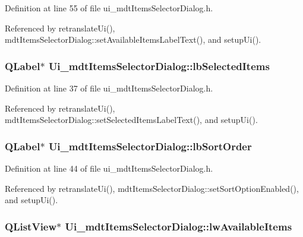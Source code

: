 Definition at line 55 of file ui\-\_\-mdt\-Items\-Selector\-Dialog.\-h.



Referenced by retranslate\-Ui(), mdt\-Items\-Selector\-Dialog\-::set\-Available\-Items\-Label\-Text(), and setup\-Ui().

\hypertarget{class_ui__mdt_items_selector_dialog_a4d76bc016714c9a3c987e1d3e180a70b}{
\subsubsection[{lb\-Selected\-Items}]{\setlength{\rightskip}{0pt plus 5cm}Q\-Label$\ast$ Ui\-\_\-mdt\-Items\-Selector\-Dialog\-::lb\-Selected\-Items}}\label{class_ui__mdt_items_selector_dialog_a4d76bc016714c9a3c987e1d3e180a70b}


Definition at line 37 of file ui\-\_\-mdt\-Items\-Selector\-Dialog.\-h.



Referenced by retranslate\-Ui(), mdt\-Items\-Selector\-Dialog\-::set\-Selected\-Items\-Label\-Text(), and setup\-Ui().

\hypertarget{class_ui__mdt_items_selector_dialog_a92f69e7c6afb7da9a45d664ad55818ff}{
\subsubsection[{lb\-Sort\-Order}]{\setlength{\rightskip}{0pt plus 5cm}Q\-Label$\ast$ Ui\-\_\-mdt\-Items\-Selector\-Dialog\-::lb\-Sort\-Order}}\label{class_ui__mdt_items_selector_dialog_a92f69e7c6afb7da9a45d664ad55818ff}


Definition at line 44 of file ui\-\_\-mdt\-Items\-Selector\-Dialog.\-h.



Referenced by retranslate\-Ui(), mdt\-Items\-Selector\-Dialog\-::set\-Sort\-Option\-Enabled(), and setup\-Ui().

\hypertarget{class_ui__mdt_items_selector_dialog_a59f5bcc000500acfc8e887ab9879e356}{
\subsubsection[{lw\-Available\-Items}]{\setlength{\rightskip}{0pt plus 5cm}Q\-List\-View$\ast$ Ui\-\_\-mdt\-Items\-Selector\-Dialog\-::lw\-Available\-Items}}\label{class_ui__mdt_items_selector_dialog_a59f5bcc000500acfc8e887ab9879e356}


